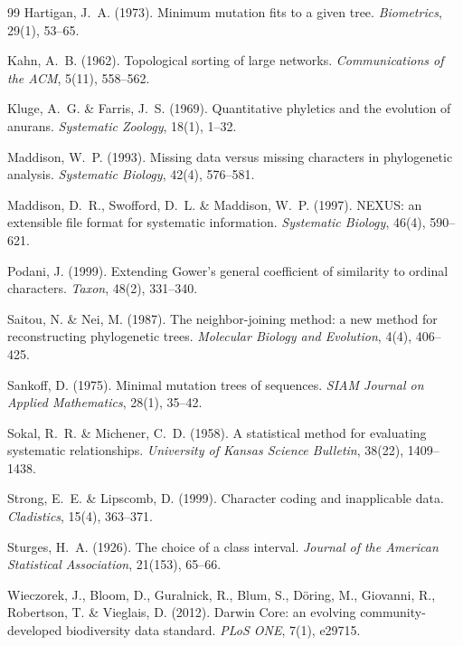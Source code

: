 \documentclass[11pt,a4paper]{article}
\theoremstyle{definition}
\theoremstyle{remark}
\begin{document}
\begin{thebibliography}{99}
Hartigan, J.~A. (1973).
Minimum mutation fits to a given tree.
\textit{Biometrics}, 29(1), 53--65.

Kahn, A.~B. (1962).
Topological sorting of large networks.
\textit{Communications of the ACM}, 5(11), 558--562.

Kluge, A.~G. \& Farris, J.~S. (1969).
Quantitative phyletics and the evolution of anurans.
\textit{Systematic Zoology}, 18(1), 1--32.

Maddison, W.~P. (1993).
Missing data versus missing characters in phylogenetic analysis.
\textit{Systematic Biology}, 42(4), 576--581.

Maddison, D.~R., Swofford, D.~L. \& Maddison, W.~P. (1997).
NEXUS: an extensible file format for systematic information.
\textit{Systematic Biology}, 46(4), 590--621.

Podani, J. (1999).
Extending Gower's general coefficient of similarity to ordinal characters.
\textit{Taxon}, 48(2), 331--340.

Saitou, N. \& Nei, M. (1987).
The neighbor-joining method: a new method for reconstructing phylogenetic trees.
\textit{Molecular Biology and Evolution}, 4(4), 406--425.

Sankoff, D. (1975).
Minimal mutation trees of sequences.
\textit{SIAM Journal on Applied Mathematics}, 28(1), 35--42.

Sokal, R.~R. \& Michener, C.~D. (1958).
A statistical method for evaluating systematic relationships.
\textit{University of Kansas Science Bulletin}, 38(22), 1409--1438.

Strong, E.~E. \& Lipscomb, D. (1999).
Character coding and inapplicable data.
\textit{Cladistics}, 15(4), 363--371.

Sturges, H.~A. (1926).
The choice of a class interval.
\textit{Journal of the American Statistical Association}, 21(153), 65--66.

Wieczorek, J., Bloom, D., Guralnick, R., Blum, S., Döring, M., Giovanni, R., Robertson, T. \& Vieglais, D. (2012).
Darwin Core: an evolving community-developed biodiversity data standard.
\textit{PLoS ONE}, 7(1), e29715.

\end{thebibliography}
\end{document}
